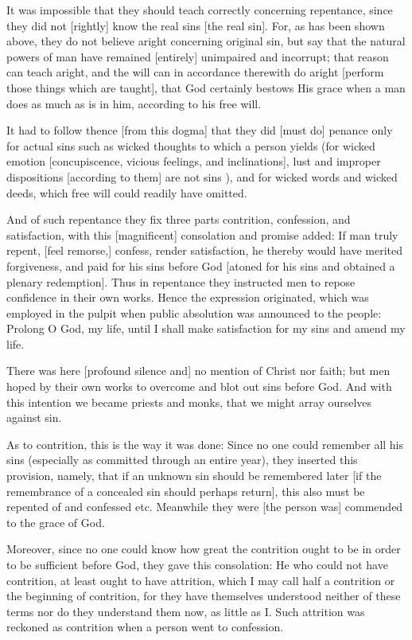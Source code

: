 It was impossible that they should teach correctly concerning
repentance, since they did not [rightly] know the real sins
[the real sin]. For, as has been shown above, they do not
believe aright concerning original sin, but say that the
natural powers of man have remained [entirely] unimpaired and
incorrupt; that reason can teach aright, and the will can in
accordance therewith do aright [perform those things which are
taught], that God certainly bestows His grace when a man does
as much as is in him, according to his free will.

It had to follow thence [from this dogma] that they did [must
do] penance only for actual sins such as wicked thoughts to
which a person yields (for wicked emotion [concupiscence,
vicious feelings, and inclinations], lust and improper
dispositions [according to them] are not sins ), and for
wicked words and wicked deeds, which free will could readily
have omitted.

And of such repentance they fix three parts contrition,
confession, and satisfaction, with this [magnificent]
consolation and promise added: If man truly repent, [feel
remorse,] confess, render satisfaction, he thereby would have
merited forgiveness, and paid for his sins before God [atoned
for his sins and obtained a plenary redemption]. Thus in
repentance they instructed men to repose confidence in their
own works. Hence the expression originated, which was employed
in the pulpit when public absolution was announced to the
people: Prolong O God, my life, until I shall make
satisfaction for my sins and amend my life.

There was here [profound silence and] no mention of Christ nor
faith; but men hoped by their own works to overcome and blot
out sins before God. And with this intention we became priests
and monks, that we might array ourselves against sin.

As to contrition, this is the way it was done: Since no one
could remember all his sins (especially as committed through
an entire year), they inserted this provision, namely, that if
an unknown sin should be remembered later [if the remembrance
of a concealed sin should perhaps return], this also must be
repented of and confessed etc. Meanwhile they were [the person
was] commended to the grace of God.

Moreover, since no one could know how great the contrition
ought to be in order to be sufficient before God, they gave
this consolation: He who could not have contrition, at least
ought to have attrition, which I may call half a contrition or
the beginning of contrition, for they have themselves
understood neither of these terms nor do they understand them
now, as little as I. Such attrition was reckoned as contrition
when a person went to confession.

